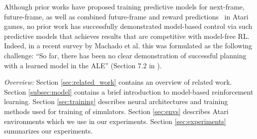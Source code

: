 Although prior works have proposed training predictive models for next-frame, future-frame, as well as combined future-frame and reward predictions~\cite{video_prediction,recurrent, video_reward_prediction} in Atari games, no prior work has successfully demonstrated model-based control via such predictive models that achieves results that are competitive with model-free RL. Indeed, in a recent survey by Machado et al. this was formulated as the following challenge: ``So far, there has been no clear demonstration of successful planning with a learned model in the ALE'' (Section 7.2 in \cite{ale2}).





\emph{Overview:}
Section \ref{sec:related_work} contains an overview of related work. Section \ref{subsec:model} contains a brief introduction to model-based reinforcement learning. Section \ref{sec:training} describes neural architectures and training methods used for training of simulators. Section \ref{sec:envs} describes Atari environments which we use in our experiments.  Section \ref{sec:experiments} summarizes our experiments. %



